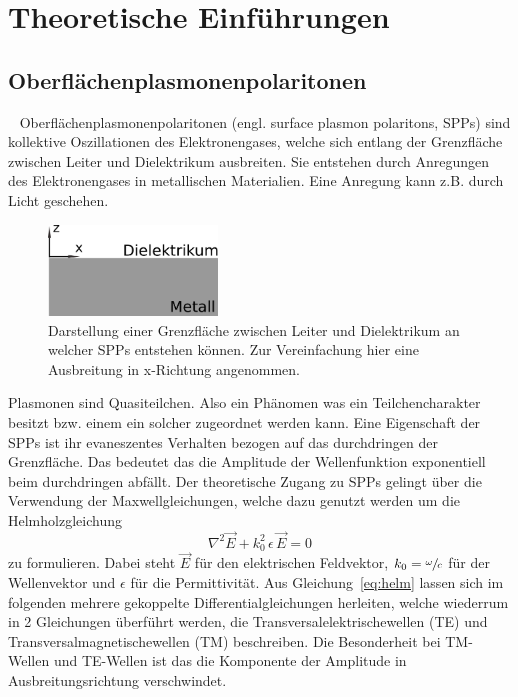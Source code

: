 \chapter{Theoretische Einführungen}

\section{Oberflächenplasmonenpolaritonen}~\label{sec:spps}
Oberflächenplasmonenpolaritonen (engl. surface plasmon polaritons, SPPs)
sind kollektive Oszillationen des Elektronengases, welche sich entlang der Grenzfläche
zwischen Leiter und Dielektrikum ausbreiten.\cite{plasmonics}
Sie entstehen durch Anregungen des Elektronengases in metallischen Materialien.
Eine Anregung kann z.B. durch Licht geschehen.

\begin{figure}
    \includegraphics[width=4.5cm]{./Plots/leiter_und_nichtleiter.pdf}
    \caption{Darstellung einer Grenzfläche zwischen Leiter und Dielektrikum an welcher 
    SPPs entstehen können. Zur Vereinfachung hier eine Ausbreitung in x-Richtung angenommen.\\}
    \label{fig:kasten}
\end{figure}
\FloatBarrier

Plasmonen sind Quasiteilchen. 
Also ein Phänomen was ein Teilchencharakter besitzt bzw. einem ein solcher zugeordnet werden kann. 
Eine Eigenschaft der SPPs ist ihr evaneszentes Verhalten bezogen auf das
durchdringen der Grenzfläche. 
Das bedeutet das die Amplitude der Wellenfunktion exponentiell beim durchdringen abfällt.
Der theoretische Zugang zu SPPs gelingt über die Verwendung der Maxwellgleichungen, welche dazu
genutzt werden um die Helmholzgleichung 
\begin{equation}
    \nabla^2 \vec{E} + k^2_0 \, \epsilon \, \vec{E} = 0
    \label{eq:helm}
\end{equation}
zu formulieren. 
Dabei steht $\vec{E}$ für den elektrischen Feldvektor, $k_0 = \sfrac{\omega}{c}$ 
für der Wellenvektor und $\epsilon$ für die Permittivität.
Aus Gleichung~\ref{eq:helm} lassen sich im folgenden mehrere gekoppelte Differentialgleichungen
herleiten, welche wiederrum in 2 Gleichungen überführt werden, die Transversalelektrischewellen (TE) und 
Transversalmagnetischewellen (TM) beschreiben.
Die Besonderheit bei TM-Wellen und TE-Wellen ist das 
die Komponente der Amplitude in Ausbreitungsrichtung verschwindet.

